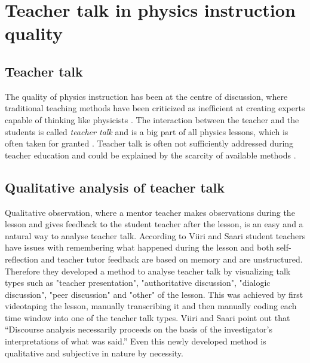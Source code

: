 \documentclass[utf8,english]{gradu3}
\begin{document}


\chapter{Teacher talk in physics instruction quality}
\label{chap:quip}

\section{Teacher talk}
The quality of physics instruction has been at the centre of discussion, where traditional teaching methods have been criticized as inefficient at creating experts capable of thinking like physicists \parencite{wiemanTransformingPhysicsEducation2007}. The interaction between the teacher and the students is called \emph{teacher talk} and is a big part of all physics lessons, which is often taken for granted \parencite{scottTeachingScienceMeaningful2007}. Teacher talk is often not sufficiently addressed during teacher education and could be explained by the scarcity of available methods \parencite{lehesvuoriDialogicTeachingScience2013,viiriTeacherTalkPatterns2006, crespoPraisingCorrectingProspective2002}.

\section{Qualitative analysis of teacher talk}
Qualitative observation, where a mentor teacher makes observations during the lesson and gives feedback to the student teacher after the lesson, is an easy and a natural way to analyse teacher talk. According to Viiri and Saari \parencite*{viiriTeacherTalkPatterns2006} student teachers have issues with remembering what happened during the lesson and both self-reflection and teacher tutor feedback are based on memory and are unstructured. Therefore they developed a method to analyse teacher talk by visualizing talk types such as "teacher presentation", "authoritative discussion", "dialogic discussion", "peer discussion" and "other" of the lesson. This was achieved by first videotaping the lesson, manually transcribing it and then manually coding each time window into one of the teacher talk types. Viiri and Saari \parencite*{viiriTeacherTalkPatterns2006} point out that \enquote{Discourse analysis necessarily proceeds on the basis of the investigator’s interpretations of what was said.} Even this newly developed method is qualitative and subjective in nature by necessity.
\end{document}
